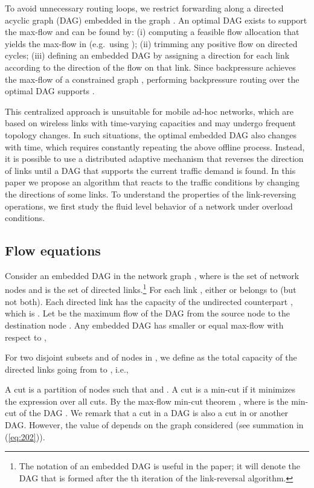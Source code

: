 \documentclass{sig-alternate-2013}
\begin{document}
To avoid unnecessary routing loops, we restrict forwarding along a directed acyclic graph (DAG) embedded in the graph . 
An optimal DAG exists to support the max-flow  and can be found by: 
(i) computing a feasible flow allocation  that yields the max-flow  in   (e.g.~using \cite{FordFulkerson}); 
(ii) trimming any positive flow on  directed cycles; 
(iii) defining an embedded DAG by assigning  a direction for each link  according to the direction of the flow  on that link. 
Since backpressure achieves the max-flow of a constrained graph \cite{neely_georgiadis}, performing backpressure routing over the optimal DAG supports .



This centralized approach is unsuitable for mobile ad-hoc networks, which are based on wireless links with  time-varying  capacities and may undergo frequent topology changes. 
In such situations,  the  optimal embedded DAG  also changes with time, which  requires  constantly repeating the above offline process.
Instead, 
it is possible to use a distributed  adaptive mechanism that   reverses the direction of links until  a DAG that supports the current traffic demand is found.
In this paper we propose  an  algorithm that  reacts to the traffic conditions by changing the directions of some links. 
 To understand the properties of 
the link-reversing operations, we first study the fluid level behavior of a network under overload conditions.

\subsection{Flow equations}

Consider an embedded DAG  in the network graph , where  is the set of network nodes and  is the set of directed links.\footnote{The notation  of an embedded DAG is useful in the paper; it will denote the DAG that is formed after the th iteration of the link-reversal algorithm.} For each link , either  or  belongs to  (but not both). Each directed link  has the capacity of the undirected counterpart , which is .
Let  be the maximum flow of the DAG  from the source node  to the destination node .
Any embedded DAG has smaller or equal max-flow with respect to ,   

For two disjoint subsets  and  of nodes in , we define  as the total capacity of the directed links going from  to , i.e.,




A cut 
is 
a partition of nodes  such that  and . A cut  is 
a min-cut if 
it minimizes the expression  over all cuts. 
By the max-flow min-cut theorem , where  is the min-cut of the DAG .
We remark that a cut in a DAG is also a cut in  or another DAG.
However, the value of  depends on the graph considered (see summation in (\ref{eq:202})).
\end{document}
